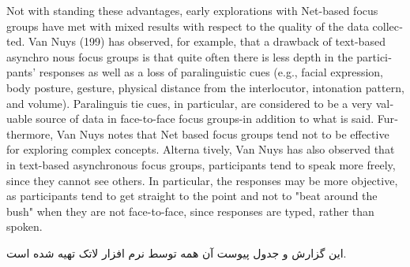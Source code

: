 \documentclass[a4 paper,12pt]{article}\usepackage{xepersian}
\begin{document}
\begin{latin}
\vspace{0.1cm}
Not with standing  these advantages, early   explorations with   Net-based focus
groups have met with  mixed results with  respect to the  quality of the  data collected. Van  Nuys (199) has  observed, for example, that  a drawback  of text-based asynchro­ nous focus groups is that  quite often there is less  depth in the participants' responses as  well as a loss of paralinguistic cues  (e.g., facial  expression, body posture, gesture, physical distance from  the  interlocutor, intonation pattern, and  volume). Paralinguis­ tie cues,  in particular, are considered to be a very  valuable source of data  in face-to-face
focus groups-in  addition to what is said.  Furthermore, Van Nuys notes that Net­
based focus groups tend not to be effective for  exploring complex concepts. Alterna­
tively, Van  Nuys has  also observed that in  text-based asynchronous focus groups, participants tend to speak more freely,  since they cannot see others. In particular, the responses may  be more objective, as participants tend to get  straight to the  point and not  to  "beat  around the  bush" when  they   are  not face-to-face, since responses are typed,  rather than spoken.



\end{latin}
\noindent
این گزارش و جدول پیوست آن همه   توسط نرم افزار لاتک تهیه شده است.
\end{document}
